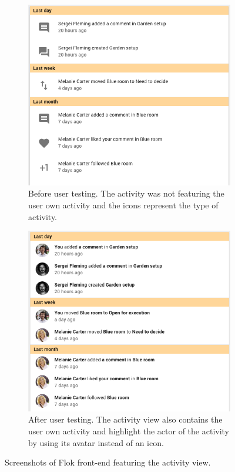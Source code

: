 \documentclass[a4paper,12pt, oneside]{article}
\begin{document}
\begin{figure}[!htb]
    \begin{subfigure}[t]{.495\textwidth}
        \includegraphics[width=\textwidth]{images/user_tests/activity_before.png}
        \caption{Before user testing. The activity was not featuring the user own activity and the icons represent the type of activity.}
        \label{fig.tests.activity.before}
    \end{subfigure}
    \hfill
    \begin{subfigure}[t]{.495\textwidth}
        \includegraphics[width=\textwidth]{images/user_tests/activity_after.png}
        \caption{After user testing. The activity view also contains the user own activity and highlight the actor of the activity by using its avatar instead of an icon.}
        \label{fig.tests.activity.after}
    \end{subfigure}
    \caption{Screenshots of Flok front-end featuring the activity view.}
    \label{fig.tests.activity}
\end{figure}
\end{document}
